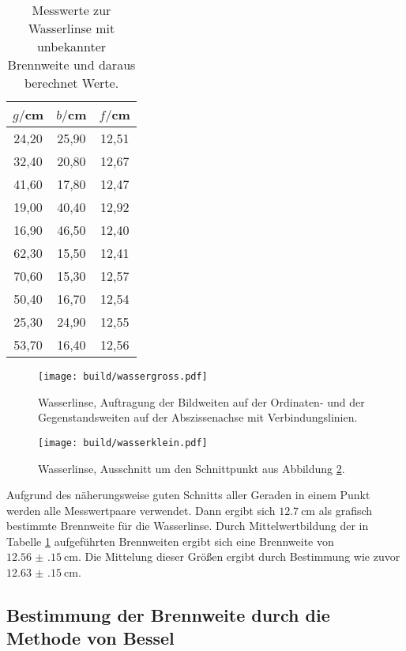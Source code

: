\begin{table}[htp]
	\begin{center}
    \caption{Messwerte zur Wasserlinse mit unbekannter Brennweite und daraus berechnet Werte.}
    \label{tab:unbekannt}
		\begin{tabular}{ccc}
		\toprule
			{$g/$cm} & {$b/$cm} & {$f/$cm}\\
			\midrule
			24,20 & 25,90 & 12,51\\
			32,40 & 20,80 & 12,67\\
			41,60 & 17,80 & 12,47\\
			19,00 & 40,40 & 12,92\\
			16,90 & 46,50 & 12,40\\
			62,30 & 15,50 & 12,41\\
			70,60 & 15,30 & 12,57\\
			50,40 & 16,70 & 12,54\\
			25,30 & 24,90 & 12,55\\
			53,70 & 16,40 & 12,56\\
		\bottomrule
		\end{tabular}
	\end{center}
\end{table}

\begin{figure}%
  \centering
  \texttt{[image: build/wassergross.pdf]}
  \caption{Wasserlinse, Auftragung der Bildweiten auf der Ordinaten- und der Gegenstandsweiten auf der Abszissenachse mit Verbindungslinien.}
  \label{fig:wassergross}
\end{figure}

\begin{figure}%
  \centering
  \texttt{[image: build/wasserklein.pdf]}
  \caption{Wasserlinse, Ausschnitt um den Schnittpunkt aus Abbildung \ref{fig:wasserklein}.}
  \label{fig:wasserklein}
\end{figure}

Aufgrund des näherungsweise guten Schnitts aller Geraden in einem Punkt werden alle
Messwertpaare verwendet. Dann ergibt sich $\SI{12.7}{\centi\meter}$ als grafisch bestimmte
Brennweite für die Wasserlinse. Durch Mittelwertbildung der in Tabelle \ref{tab:unbekannt}
aufgeführten Brennweiten ergibt sich eine Brennweite von $\SI{12.56(15)}{\centi\meter}$.
Die Mittelung dieser Größen ergibt durch Bestimmung wie zuvor $\SI{12.63(15)}{\centi\meter}$.

\subsection{Bestimmung der Brennweite durch die Methode von Bessel}

